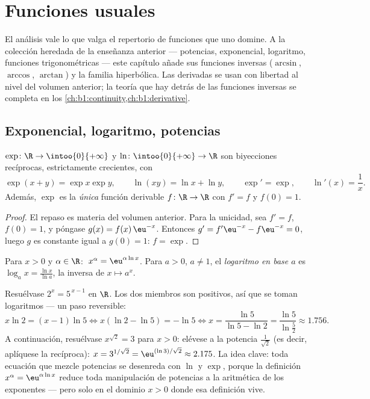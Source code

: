 \chapter{Funciones usuales}\label{ch:b1:functions}

El análisis vale lo que valga el repertorio de funciones que uno
domine. A la colección heredada de la enseñanza anterior --- potencias,
exponencial, logaritmo, funciones trigonométricas --- este capítulo
añade sus funciones inversas ($\arcsin$, $\arccos$, $\arctan$) y la
familia hiperbólica. Las derivadas se usan con libertad al nivel del
volumen anterior; la teoría que hay detrás de las funciones inversas se
completa en los \cref{ch:b1:continuity,ch:b1:derivative}.

\section{Exponencial, logaritmo, potencias}

\begin{proposition}\label{prop:b1:functions:expln}
$\exp \colon \R \to \intoo{0}{+\infty}$ y $\ln \colon
\intoo{0}{+\infty} \to \R$ son biyecciones recíprocas, estrictamente
crecientes, con
\[
\exp(x + y) = \exp x \exp y, \qquad \ln(xy) = \ln x + \ln y,
\qquad \exp' = \exp, \qquad \ln'(x) = \frac 1x .
\]
Además, $\exp$ es la \emph{única} función derivable $f \colon
\R \to \R$ con $f' = f$ y $f(0) = 1$.
\end{proposition}

\begin{proof}
El repaso es materia del volumen anterior. Para la unicidad, sea
$f' = f$, $f(0) = 1$, y póngase $g(x) = f(x)\,\eu^{-x}$. Entonces
$g' = f'\eu^{-x} - f\eu^{-x} = 0$, luego $g$ es constante igual a
$g(0) = 1$: $f = \exp$.
\end{proof}

\begin{definition}\label{def:b1:functions:powers}
Para $x > 0$ y $\alpha \in \R$:
$\;x^\alpha = \eu^{\alpha \ln x}$. Para $a > 0$,
$a \neq 1$, el \emph{logaritmo en base $a$} es $\log_a x =
\frac{\ln x}{\ln a}$, la inversa de $x \mapsto a^x$.
\end{definition}

\begin{example}\label{ex:b1:functions:expequations}
Resuélvase $2^x = 5^{\,x-1}$ en $\R$. Los dos miembros son positivos,
así que se toman logaritmos --- un paso reversible:
\[
x\ln2 = (x - 1)\ln5
\iff x(\ln2 - \ln5) = -\ln5
\iff x = \frac{\ln5}{\ln5 - \ln2} = \frac{\ln 5}{\ln\frac52}
\approx 1.756 .
\]
A continuación, resuélvase $x^{\sqrt2} = 3$ para $x > 0$: elévese a la
potencia $\frac1{\sqrt2}$ (es decir, aplíquese la  recíproca):
$x = 3^{1/\sqrt2} = \eu^{(\ln 3)/\sqrt2} \approx 2.175$. La idea clave:
toda ecuación que mezcle potencias se desenreda con $\ln$ y $\exp$,
porque la definición $x^\alpha = \eu^{\alpha\ln x}$ reduce toda
manipulación de potencias a la aritmética de los exponentes --- pero
solo en el dominio $x > 0$ donde esa definición vive.
\end{example}


